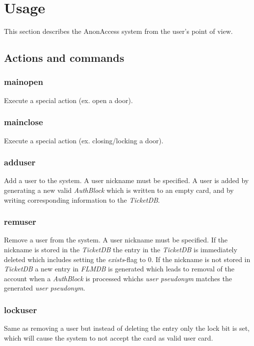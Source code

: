 \section{Usage}
This section describes the AnonAccess system from the user's point of view.


\subsection{Actions and commands}
\subsubsection{mainopen}
Execute a special action (ex. open a door).

\subsubsection{mainclose} 
Execute a special action (ex. closing/locking a door).

\subsubsection{adduser}
Add a user to the system. A user nickname must be specified. A user is added by generating a new valid \textit{AuthBlock} which is written to an empty card, and by writing corresponding information to the \textit{TicketDB}.
 
\subsubsection{remuser}
Remove a user from the system. A user nickname must be specified. If the nickname is stored in the \textit{TicketDB} the entry in the \textit{TicketDB} is immediately deleted which includes setting the \textit{exists}-flag to 0. If the nickname is not stored in \textit{TicketDB} a new entry in \textit{FLMDB} is generated which leads to removal of the account when a \textit{AuthBlock} is processed whichs \textit{user pseudonym} matches the generated \textit{user pseudonym}. 

\subsubsection{lockuser}
Same as removing a user but instead of deleting the entry only the lock bit is set, which will cause the system to not accept the card as valid user card.

